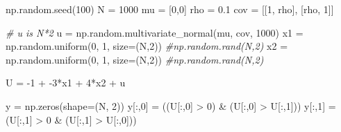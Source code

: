 \documentclass[]{tufte-book}
\newenvironment{Shaded}{}{}
\newcommand{\CommentTok}[1]{\textcolor[rgb]{0.38,0.63,0.69}{\textit{#1}}}
\newcommand{\DecValTok}[1]{\textcolor[rgb]{0.25,0.63,0.44}{#1}}
\newcommand{\FloatTok}[1]{\textcolor[rgb]{0.25,0.63,0.44}{#1}}
\newcommand{\NormalTok}[1]{#1}
\newcommand{\OperatorTok}[1]{\textcolor[rgb]{0.40,0.40,0.40}{#1}}
\theoremstyle{definition}
\theoremstyle{definition}
\theoremstyle{definition}
\theoremstyle{remark}
\begin{document}
\begin{Shaded}
\begin{Highlighting}[]
\NormalTok{np.random.seed(}\DecValTok{100}\NormalTok{)}
\NormalTok{N }\OperatorTok{=} \DecValTok{1000}
\NormalTok{mu }\OperatorTok{=}\NormalTok{ [}\DecValTok{0}\NormalTok{,}\DecValTok{0}\NormalTok{]}
\NormalTok{rho }\OperatorTok{=} \FloatTok{0.1}
\NormalTok{cov }\OperatorTok{=}\NormalTok{ [[}\DecValTok{1}\NormalTok{, rho], [rho, }\DecValTok{1}\NormalTok{]]}

\CommentTok{\# u is N*2}
\NormalTok{u }\OperatorTok{=}\NormalTok{ np.random.multivariate\_normal(mu, cov, }\DecValTok{1000}\NormalTok{)}
\NormalTok{x1 }\OperatorTok{=}\NormalTok{ np.random.uniform(}\DecValTok{0}\NormalTok{, }\DecValTok{1}\NormalTok{, size}\OperatorTok{=}\NormalTok{(N,}\DecValTok{2}\NormalTok{)) }\CommentTok{\#np.random.rand(N,2)}
\NormalTok{x2 }\OperatorTok{=}\NormalTok{ np.random.uniform(}\DecValTok{0}\NormalTok{, }\DecValTok{1}\NormalTok{, size}\OperatorTok{=}\NormalTok{(N,}\DecValTok{2}\NormalTok{)) }\CommentTok{\#np.random.rand(N,2)}

\NormalTok{U }\OperatorTok{=} \OperatorTok{{-}}\DecValTok{1} \OperatorTok{+} \OperatorTok{{-}}\DecValTok{3}\OperatorTok{*}\NormalTok{x1 }\OperatorTok{+} \DecValTok{4}\OperatorTok{*}\NormalTok{x2 }\OperatorTok{+}\NormalTok{ u}

\NormalTok{y }\OperatorTok{=}\NormalTok{ np.zeros(shape}\OperatorTok{=}\NormalTok{(N, }\DecValTok{2}\NormalTok{))}
\NormalTok{y[:,}\DecValTok{0}\NormalTok{] }\OperatorTok{=}\NormalTok{ ((U[:,}\DecValTok{0}\NormalTok{] }\OperatorTok{\textgreater{}} \DecValTok{0}\NormalTok{) }\OperatorTok{\&}\NormalTok{ (U[:,}\DecValTok{0}\NormalTok{] }\OperatorTok{\textgreater{}}\NormalTok{ U[:,}\DecValTok{1}\NormalTok{]))}
\NormalTok{y[:,}\DecValTok{1}\NormalTok{] }\OperatorTok{=}\NormalTok{ (U[:,}\DecValTok{1}\NormalTok{] }\OperatorTok{\textgreater{}} \DecValTok{0} \OperatorTok{\&}\NormalTok{ (U[:,}\DecValTok{1}\NormalTok{] }\OperatorTok{\textgreater{}}\NormalTok{ U[:,}\DecValTok{0}\NormalTok{]))}


\end{Highlighting}
\end{Shaded}
\end{document}
